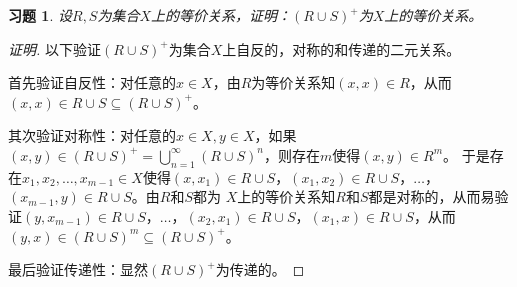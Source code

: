 \documentclass{article}
\begin{document}
\begin{CJK}{UTF8}{gbsn}
\newtheorem*{Ex}{习题}
\begin{Ex}
设$R,S$为集合$X$上的等价关系，证明：$(R\cup S)^+$为$X$上的等价关系。
\end{Ex}
\begin{proof}[证明]
  以下验证$(R\cup S)^+$为集合$X$上自反的，对称的和传递的二元关系。

  首先验证自反性：对任意的$x\in X$，由$R$为等价关系知$(x,x)\in R$，从而$(x,x)\in R\cup S\subseteq (R\cup S)^+$。

  其次验证对称性：对任意的$x\in X, y\in X$，如果$(x,y)\in (R\cup S)^+=\bigcup_{n=1}^{\infty}(R\cup S)^n$，则存在$m$使得$(x,y)\in R^m$。
  于是存在$x_1,x_2,\ldots,x_{m-1}\in X$使得$(x,x_1)\in R\cup S$，$(x_1,x_2)\in R\cup S$，$\ldots$，$(x_{m-1},y)\in R\cup S$。由$R$和$S$都为
  $X$上的等价关系知$R$和$S$都是对称的，从而易验证$(y,x_{m-1})\in R\cup S$，$\ldots$，$(x_2,x_1)\in R\cup S$，$(x_1,x)\in R\cup S$，从而$(y,x)\in (R\cup S)^m \subseteq (R\cup S)^+$。

  最后验证传递性：显然$(R\cup S)^+$为传递的。
\end{proof}
\end{CJK}
\end{document}
